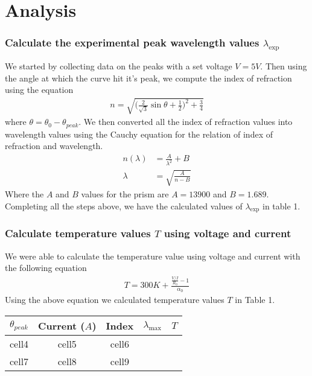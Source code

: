 \documentclass{article}
\begin{document}
\newpage

\section{Analysis}
\subsubsection*{Calculate the experimental peak wavelength values $\lambda_{\exp}$}
We started by collecting data on the peaks with a set voltage $V = 5V$. Then
using the angle at which the curve hit it's peak, we compute the index of refraction
using the equation
\begin{align*}
    n = \sqrt{\bigg(\frac{2}{\sqrt{3}} \sin\theta + \frac{1}{2}\bigg)^2 + \frac{3}{4}}
\end{align*}
where $\theta = \theta_0 - \theta_{peak}$. We then converted all the index of
refraction values into wavelength values using the Cauchy equation for the relation
of index of refraction and wavelength.
\begin{align*}
    n(\lambda) &= \frac{A}{\lambda^2} + B\\
    \lambda &= \sqrt{\frac{A}{n - B}}
\end{align*}
Where the $A$ and $B$ values for the prism are $A = 13900$ and $B = 1.689$. 
Completing all the steps above, we have the calculated values of $\lambda_{\exp}$
in table 1.

\subsubsection*{Calculate temperature values $T$ using voltage and current}
We were able to calculate the temperature value using voltage and current with
the following equation
\begin{align*}
    T = 300K + \frac{\frac{V / I}{R_0} - 1}{\alpha_0}
\end{align*}
Using the above equation we calculated temperature values $T$ in Table 1.

\begin{center}
    \begin{tabular}{ c | c | c | c | c}
     $\theta_{peak}$ & Current ($A$) & Index & $\lambda_{\max}$ & $T$\\
     \hline 
     cell4 & cell5 & cell6 &  &\\  
     cell7 & cell8 & cell9 &  &
    \end{tabular}
\end{center}
\end{document}
